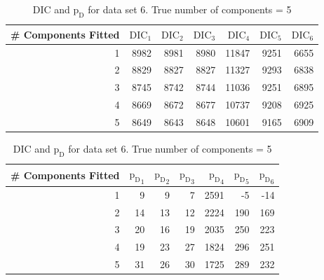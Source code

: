 \begin{table}[!htb]
\centering
\captionsetup{justification=centering}
\caption{DIC and $\text{p}_\text{D}$ for data set 6. True number of components = 5}
\label{table : ds_5wellsep_dic}
\begin{tabular}{@{}rrrrrrr@{}}
\toprule
\# Components Fitted & $\text{DIC}_1$ & $\text{DIC}_2$  & $\text{DIC}_3$  & $\text{DIC}_4$  & $\text{DIC}_5$  & $\text{DIC}_6$  \\ \midrule
1 & 8982 & 8981 & 8980 & 11847 & 9251 & 6655 \\
2 & 8829 & 8827 & 8827 & 11327 & 9293 & 6838 \\
3 & 8745 & 8742 & 8744 & 11036 & 9251 & 6895 \\
4 & 8669 & 8672 & 8677 & 10737 & 9208 & 6925 \\
5 & 8649 & 8643 & 8648 & 10601 & 9165 & 6909 \\
\bottomrule
\end{tabular}

\begin{tabular}{@{}rrrrrrr@{}}
\toprule
\# Components Fitted & ${\text{p}_\text{D}}_1$ & ${\text{p}_\text{D}}_2$ & ${\text{p}_\text{D}}_3$ & ${\text{p}_\text{D}}_4$ & ${\text{p}_\text{D}}_5$ & ${\text{p}_\text{D}}_6$ \\ \midrule
1 & 9 & 9 & 7 & 2591 & -5 & -14 \\
2 & 14 & 13 & 12 & 2224 & 190 & 169 \\
3 & 20 & 16 & 19 & 2035 & 250 & 223 \\
4 & 19 & 23 & 27 & 1824 & 296 & 251 \\
5 & 31 & 26 & 30 & 1725 & 289 & 232 \\
\bottomrule
\end{tabular}
\end{table}

